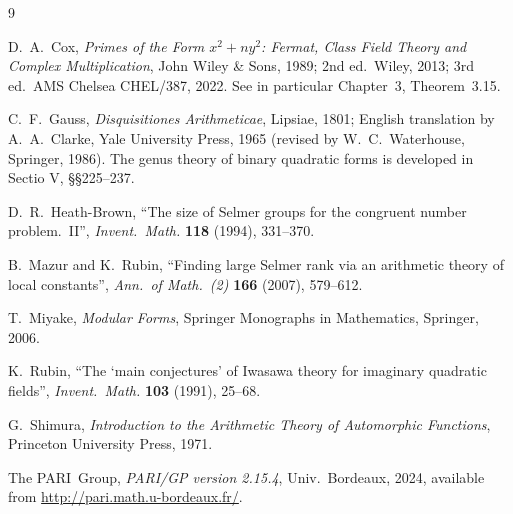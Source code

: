 \documentclass[11pt]{amsart}
\theoremstyle{definition}
\theoremstyle{remark}
\begin{document}



\begin{thebibliography}{9}

D.~A.~Cox, \emph{Primes of the Form \(x^2+ny^2\):
Fermat, Class Field Theory and Complex Multiplication}, John
Wiley \& Sons, 1989; 2nd ed.\ Wiley, 2013; 3rd ed.\ AMS Chelsea
CHEL/387, 2022. See in particular Chapter~3, Theorem~3.15.

C.~F.~Gauss, \emph{Disquisitiones Arithmeticae}, Lipsiae, 1801;
English translation by A.~A.~Clarke, Yale University Press, 1965
(revised by W.~C.~Waterhouse, Springer, 1986). The genus theory of
binary quadratic forms is developed in Sectio V, \S\S 225--237.

D.~R.~Heath-Brown, ``The size of Selmer groups for the congruent number
problem.~II'', \emph{Invent.\ Math.} \textbf{118} (1994), 331--370.

B.~Mazur and K.~Rubin, ``Finding large Selmer rank via an arithmetic
theory of local constants'', \emph{Ann.\ of Math.\ (2)} \textbf{166}
(2007), 579--612.

T.~Miyake, \emph{Modular Forms}, Springer Monographs in Mathematics,
Springer, 2006.

K.~Rubin, ``The `main conjectures' of Iwasawa theory for imaginary
quadratic fields'', \emph{Invent.\ Math.} \textbf{103} (1991), 25--68.

G.~Shimura, \emph{Introduction to the Arithmetic Theory of Automorphic
Functions}, Princeton University Press, 1971.

The PARI~Group, \emph{PARI/GP version 2.15.4}, Univ.~Bordeaux, 2024,
available from \url{http://pari.math.u-bordeaux.fr/}.

\end{thebibliography}
\end{document}
